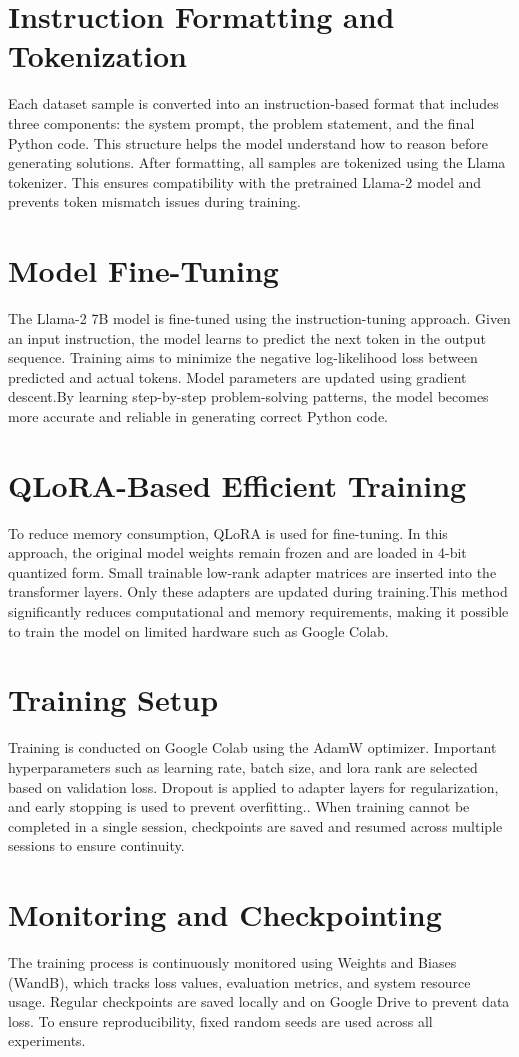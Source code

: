 \begin{normaltext}
\section{Instruction Formatting and Tokenization}
Each dataset sample is converted into an instruction-based format that includes three components: the system prompt, the problem statement,  and the final Python code. This structure helps the model understand how to reason before generating solutions. After formatting, all samples are tokenized using the Llama tokenizer. This ensures compatibility with the pretrained Llama-2 model and prevents token mismatch issues during training.
\section{Model Fine-Tuning}
The Llama-2 7B model is fine-tuned using the instruction-tuning approach. Given an input instruction, the model learns to predict the next token in the output sequence. Training aims to minimize the negative log-likelihood loss between predicted and actual tokens. Model parameters are updated using gradient descent.By learning step-by-step problem-solving patterns, the model becomes more accurate and reliable in generating correct Python code.
\section{QLoRA-Based Efficient Training}
To reduce memory consumption, QLoRA is used for fine-tuning. In this approach, the original model weights remain frozen and are loaded in 4-bit quantized form. Small trainable low-rank adapter matrices are inserted into the transformer layers. Only these adapters are updated during training.This method significantly reduces computational and memory requirements, making it possible to train the model on limited hardware such as Google Colab. 
\section{Training Setup}
Training is conducted on Google Colab using the AdamW optimizer. Important hyperparameters such as learning rate, batch size, and lora rank are selected based on validation loss. Dropout is applied to adapter layers for regularization, and early stopping is used to prevent overfitting.. When training cannot be completed in a single session, checkpoints are saved and resumed across multiple sessions to ensure continuity.
\section{Monitoring and Checkpointing}
The training process is continuously monitored using Weights and Biases (WandB), which tracks loss values, evaluation metrics, and system resource usage. Regular checkpoints are saved locally and on Google Drive to prevent data loss. To ensure reproducibility, fixed random seeds are used across all experiments. 

\end{normaltext}
